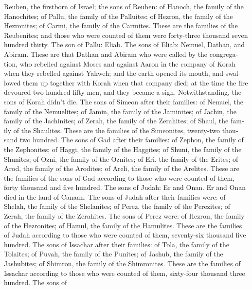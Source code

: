 \begin{paracol}{2}
\begin{otherlanguage}{english}
 Reuben, the firstborn of Israel; the sons of Reuben: of
Hanoch, the family of the Hanochites; of Pallu, the family of the
Palluites;  of Hezron, the family of the Hezronites; of
Carmi, the family of the Carmites.  These are the families
of the Reubenites; and those who were counted of them were forty-three
thousand seven hundred thirty.  The son of Pallu: Eliab.
 The sons of Eliab: Nemuel, Dathan, and Abiram. These are
that Dathan and Abiram who were called by the congregation, who rebelled
against Moses and against Aaron in the company of Korah when they
rebelled against Yahweh;  and the earth opened its mouth,
and swallowed them up together with Korah when that company died; at the
time the fire devoured two hundred fifty men, and they became a sign.
 Notwithstanding, the sons of Korah didn't die.
 The sons of Simeon after their families: of Nemuel, the
family of the Nemuelites; of Jamin, the family of the Jaminites; of
Jachin, the family of the Jachinites;  of Zerah, the
family of the Zerahites; of Shaul, the family of the Shaulites.
 These are the families of the Simeonites, twenty-two
thousand two hundred.  The sons of Gad after their
families: of Zephon, the family of the Zephonites; of Haggi, the family
of the Haggites; of Shuni, the family of the Shunites; 
of Ozni, the family of the Oznites; of Eri, the family of the Erites;
 of Arod, the family of the Arodites; of Areli, the
family of the Arelites.  These are the families of the
sons of Gad according to those who were counted of them, forty thousand
and five hundred.  The sons of Judah: Er and Onan. Er and
Onan died in the land of Canaan.  The sons of Judah after
their families were: of Shelah, the family of the Shelanites; of Perez,
the family of the Perezites; of Zerah, the family of the Zerahites.
 The sons of Perez were: of Hezron, the family of the
Hezronites; of Hamul, the family of the Hamulites.  These
are the families of Judah according to those who were counted of them,
seventy-six thousand five hundred.  The sons of Issachar
after their families: of Tola, the family of the Tolaites; of Puvah, the
family of the Punites;  of Jashub, the family of the
Jashubites; of Shimron, the family of the Shimronites. 
These are the families of Issachar according to those who were counted
of them, sixty-four thousand three hundred.  The sons of

\end{otherlanguage}
\end{paracol}

